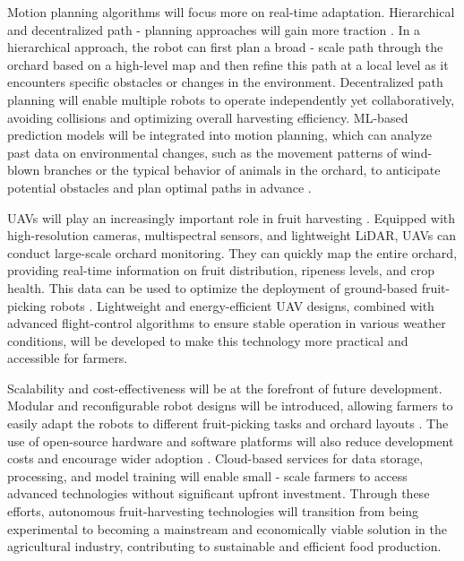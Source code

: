 \documentclass{ieeeaccess}
\begin{document}
Motion planning algorithms will focus more on real-time adaptation. Hierarchical and decentralized path - planning approaches will gain more traction \cite{lytridis2021overview, li2023multi}. In a hierarchical approach, the robot can first plan a broad - scale path through the orchard based on a high-level map and then refine this path at a local level as it encounters specific obstacles or changes in the environment. Decentralized path planning will enable multiple robots to operate independently yet collaboratively, avoiding collisions and optimizing overall harvesting efficiency. ML-based prediction models will be integrated into motion planning, which can analyze past data on environmental changes, such as the movement patterns of wind-blown branches or the typical behavior of animals in the orchard, to anticipate potential obstacles and plan optimal paths in advance \cite{rajendran2024towards}.

UAVs will play an increasingly important role in fruit harvesting \cite{mohamed2021smart, martos2021ensuring}. Equipped with high-resolution cameras, multispectral sensors, and lightweight LiDAR, UAVs can conduct large-scale orchard monitoring. They can quickly map the entire orchard, providing real-time information on fruit distribution, ripeness levels, and crop health. This data can be used to optimize the deployment of ground-based fruit-picking robots \cite{martos2021ensuring}. Lightweight and energy-efficient UAV designs, combined with advanced flight-control algorithms to ensure stable operation in various weather conditions, will be developed to make this technology more practical and accessible for farmers.

Scalability and cost-effectiveness will be at the forefront of future development. Modular and reconfigurable robot designs will be introduced, allowing farmers to easily adapt the robots to different fruit-picking tasks and orchard layouts \cite{lytridis2021overview, li2023multi}. The use of open-source hardware and software platforms will also reduce development costs and encourage wider adoption \cite{zhang2024automatic}. Cloud-based services for data storage, processing, and model training will enable small - scale farmers to access advanced technologies without significant upfront investment. Through these efforts, autonomous fruit-harvesting technologies will transition from being experimental to becoming a mainstream and economically viable solution in the agricultural industry, contributing to sustainable and efficient food production.
\end{document}
